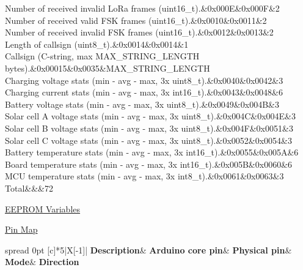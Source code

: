 \begin{DoxyCompactItemize}
\begin{DoxyCompactList}
\begin{longtabu}
Number of received invalid Lo\+Ra frames (uint16\+\_\+t).&0x000E&0x000F&2 \\
Number of received valid F\+SK frames (uint16\+\_\+t).&0x0010&0x0011&2 \\
Number of received invalid F\+SK frames (uint16\+\_\+t).&0x0012&0x0013&2 \\
Length of callsign (uint8\+\_\+t).&0x0014&0x0014&1 \\
Callsign (C-\/string, max M\+A\+X\+\_\+\+S\+T\+R\+I\+N\+G\+\_\+\+L\+E\+N\+G\+TH bytes).&0x00015&0x0035&M\+A\+X\+\_\+\+S\+T\+R\+I\+N\+G\+\_\+\+L\+E\+N\+G\+TH \\
Charging voltage stats (min -\/ avg -\/ max, 3x uint8\+\_\+t).&0x0040&0x0042&3 \\
Charging current stats (min -\/ avg -\/ max, 3x int16\+\_\+t).&0x0043&0x0048&6 \\
Battery voltage stats (min -\/ avg -\/ max, 3x uint8\+\_\+t).&0x0049&0x004B&3 \\
Solar cell A voltage stats (min -\/ avg -\/ max, 3x uint8\+\_\+t).&0x004C&0x004E&3 \\
Solar cell B voltage stats (min -\/ avg -\/ max, 3x uint8\+\_\+t).&0x004F&0x0051&3 \\
Solar cell C voltage stats (min -\/ avg -\/ max, 3x uint8\+\_\+t).&0x0052&0x0054&3 \\
Battery temperature stats (min -\/ avg -\/ max, 3x int16\+\_\+t).&0x0055&0x005A&6 \\
Board temperature stats (min -\/ avg -\/ max, 3x int16\+\_\+t).&0x005B&0x0060&6 \\
M\+CU temperature stats (min -\/ avg -\/ max, 3x int8\+\_\+t).&0x0061&0x0063&3 \\
Total&&&72 \\
\end{longtabu}
\end{DoxyCompactList}\item 
\hyperlink{group__defines__eeprom__variables}{E\+E\+P\+R\+O\+M Variables}
\item 
\hyperlink{group__defines__pin__map}{Pin Map}
\begin{DoxyCompactList}\small\item\em \tabulinesep=1mm
\begin{longtabu} spread 0pt [c]{*{5}{|X[-1]}|}
\hline
\rowcolor{\tableheadbgcolor}\textbf{ Description}&\textbf{ Arduino core pin}&\textbf{ Physical pin}&\textbf{ Mode}&\textbf{ Direction  }\\

\end{longtabu}
\end{DoxyCompactList}
\end{DoxyCompactItemize}
